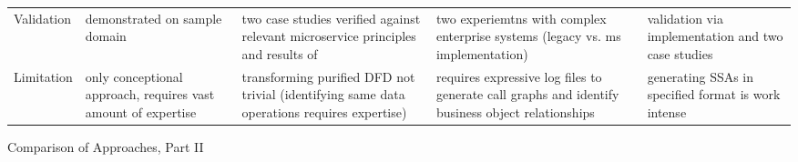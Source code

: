 {\begin{landscape}
\begin{threeparttable}[h!]
\begin{tabularx}{\linewidth}{XXXXX}
				Validation & demonstrated on sample domain& two case studies verified against relevant microservice principles and results of \cite{ServiceCutter} & two experiemtns with complex enterprise systems (legacy vs. ms implementation) & validation via implementation and two case studies\\
				
				Limitation & only conceptional approach, requires vast amount of expertise & transforming purified DFD not trivial (identifying same data operations requires expertise)& requires expressive log files to generate call graphs and identify business object relationships& generating SSAs in specified format is work intense  \\
				
			\end{tabularx}
			\caption{Comparison of Approaches, Part II}
			\label{tab:compareApproaches2}
			
			
			
		\end{threeparttable}
		
		
		
	\end{landscape}
	\clearpage%
}
 

 
  























